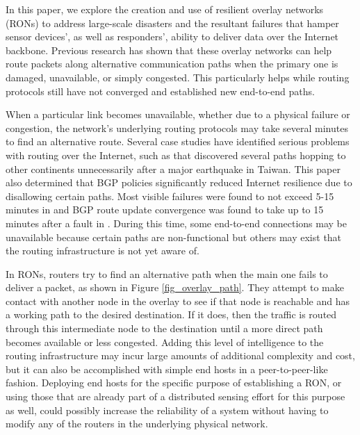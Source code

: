\documentclass[conference]{IEEEtran}
\begin{document}
In this paper, we explore the creation and use of resilient overlay networks (RONs) to address large-scale disasters and the resultant failures that hamper sensor devices', as well as responders', ability to deliver data over the Internet backbone.
Previous research \cite{ron,reactive_routing} has shown that these overlay networks can help route packets along alternative communication paths when the primary one is damaged, unavailable, or simply congested.
This particularly helps while routing protocols still have not converged and established new end-to-end paths.


When a particular link becomes unavailable, whether due to a physical failure or congestion, the network's underlying routing protocols may take several minutes to find an alternative route.
Several case studies have identified serious problems with routing over the Internet, such as \cite{routing_resilience_analysis} that discovered several paths hopping to other continents unnecessarily after a major earthquake in Taiwan.
This paper also determined that BGP policies significantly reduced Internet resilience due to disallowing certain paths.
Most visible failures were found to not exceed 5-15 minutes in \cite{reactive_routing} and BGP route update convergence was found to take up to 15 minutes after a fault in \cite{route_convergence}.
During this time, some end-to-end connections may be unavailable because certain paths are non-functional but others may exist that the routing infrastructure is not yet aware of.


In RONs, routers try to find an alternative path when the main one fails to deliver a packet, as shown in Figure \ref{fig_overlay_path}.
They attempt to make contact with another node in the overlay to see if that node is reachable and has a working path to the desired destination.
If it does, then the traffic is routed through this intermediate node to the destination until a more direct path becomes available or less congested.
Adding this level of intelligence to the routing infrastructure may incur large amounts of additional complexity and cost, but it can also be accomplished with simple end hosts in a peer-to-peer-like fashion.
Deploying end hosts for the specific purpose of establishing a RON, or using those that are already part of a distributed sensing effort for this purpose as well, could possibly increase the reliability of a system without having to modify any of the routers in the underlying physical network.
\end{document}
